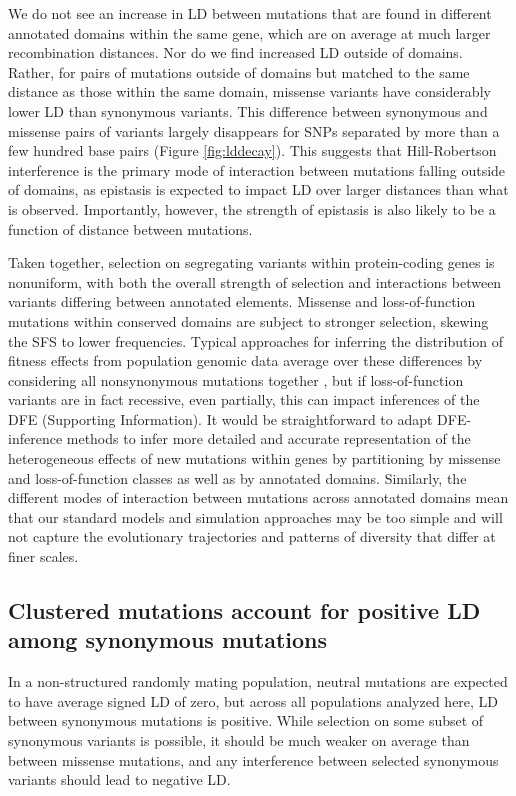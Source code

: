 \documentclass[]{article}
\begin{document}
We do not see an increase in LD between mutations that are found in different
annotated domains within the same gene, which are on average at much larger
recombination distances. Nor do we find increased LD outside of domains.
Rather, for pairs of mutations outside of domains but matched to the same
distance as those within the same domain, missense variants have considerably
lower LD than synonymous variants. This difference between synonymous and
missense pairs of variants largely disappears for SNPs separated by more than a
few hundred base pairs (Figure \ref{fig:lddecay}). This suggests that
Hill-Robertson interference is the primary mode of interaction between
mutations falling outside of domains, as epistasis is expected to impact LD
over larger distances than what is observed. Importantly, however, the strength
of epistasis is also likely to be a function of distance between mutations.

Taken together, selection on segregating variants within protein-coding genes
is nonuniform, with both the overall strength of selection and interactions
between variants differing between annotated elements. Missense and
loss-of-function mutations within conserved domains are subject to stronger
selection, skewing the SFS to lower frequencies. Typical approaches for
inferring the distribution of fitness effects from population genomic data
average over these differences by considering all nonsynonymous mutations
together \citep{Boyko2008-zk,Kim2017-xo}, but if loss-of-function variants are in
fact recessive, even partially, this can impact inferences of the DFE
(Supporting Information). It would be straightforward to adapt DFE-inference
methods to infer more detailed and accurate representation of the heterogeneous
effects of new mutations within genes by partitioning by missense and
loss-of-function classes as well as by annotated domains. Similarly, the
different modes of interaction between mutations across annotated domains mean
that our standard models and simulation approaches may be too simple and will
not capture the evolutionary trajectories and patterns of diversity that differ
at finer scales.

\subsection{Clustered mutations account for positive LD among synonymous mutations}
\label{clustered-mutations-account-for-positive-ld-among-synonymous-mutations}

In a non-structured randomly mating population, neutral mutations are expected to have
average signed LD of zero, but across all populations analyzed here, LD between
synonymous mutations is positive. While selection on some subset of synonymous
variants is possible, it should be much weaker on average than between missense
mutations, and any interference between selected synonymous variants should
lead to negative LD.
\end{document}
